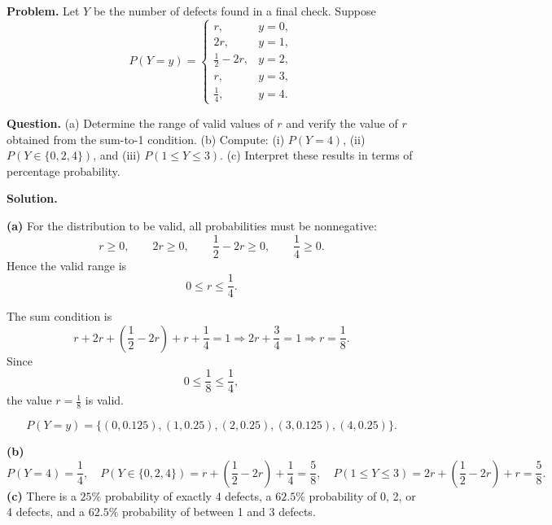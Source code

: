 \begin{ExamProblems}
			\textbf{Problem.}
		Let $Y$ be the number of defects found in a final check. Suppose
		\[
		P(Y=y)=\begin{cases}
			r, & y=0,\\
			2r, & y=1,\\
			\frac{1}{2}-2r, & y=2,\\
			r, & y=3,\\
			\frac{1}{4}, & y=4.
		\end{cases}
		\]
		
		\textbf{Question.}
		(a) Determine the range of valid values of $r$ and verify the value of $r$ obtained from the sum-to-1 condition.
		(b) Compute: (i) $P(Y=4)$, (ii) $P(Y\in\{0,2,4\})$, and (iii) $P(1\le Y\le 3)$.
		(c) Interpret these results in terms of percentage probability.
		
		\textbf{Solution.}

		\textbf{(a)} For the distribution to be valid, all probabilities must be nonnegative:
		\[
		r\ge 0,\qquad 2r\ge 0,\qquad \frac{1}{2}-2r\ge 0,\qquad \frac{1}{4}\ge 0.
		\]
		Hence the valid range is
		\[
		0\le r\le \frac{1}{4}.
		\]
		
		The sum condition is
		\[
		r+2r+\left(\frac{1}{2}-2r\right)+r+\frac{1}{4}=1
		\Rightarrow 2r+\frac{3}{4}=1
		\Rightarrow r=\frac{1}{8}.
		\]
		Since
		\[
		0\le \frac{1}{8}\le \frac{1}{4},
		\]
		the value $r=\frac{1}{8}$ is valid.
		

		
\[
		P(Y=y)=\{(0,0.125),(1,0.25),(2,0.25),(3,0.125),(4,0.25)\}.
		\]
\begin{center}
		\end{center}
\textbf{(b)}
		\[
		P(Y=4)=\frac{1}{4},\quad
		P(Y\in\{0,2,4\})=r+\left(\frac{1}{2}-2r\right)+\frac{1}{4}=\frac{5}{8},\quad
		P(1\le Y\le 3)=2r+\left(\frac{1}{2}-2r\right)+r=\frac{5}{8}.
		\]
		\textbf{(c)} There is a $25\%$ probability of exactly 4 defects, a $62.5\%$ probability of 0, 2, or 4 defects, and a $62.5\%$ probability of between 1 and 3 defects.
		

\end{ExamProblems}
